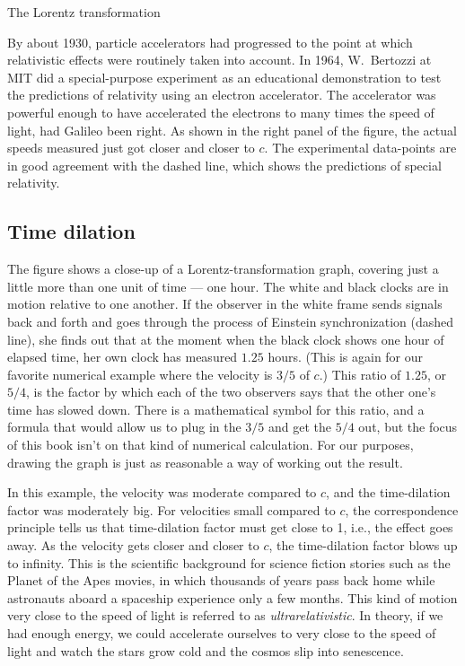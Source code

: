 \begin{section}{The Lorentz transformation}

By about 1930, particle accelerators had progressed to the point
at which relativistic effects were routinely taken into account. In
1964, W.~Bertozzi at MIT did a special-purpose experiment as an educational demonstration
to test the predictions of relativity using an electron accelerator.
The accelerator was powerful enough to have accelerated the electrons to many times
the speed of light, had Galileo been right. As shown in the right panel of the figure,
the actual speeds measured just got closer
and closer to $c$. The experimental data-points are in good agreement with the dashed line, which
shows the predictions of special relativity.

\section{Time dilation}

The figure shows a close-up of a Lorentz-transformation graph, covering just a little more
than one unit of time --- one hour. The white and black clocks are in motion relative to one
another. If the observer in the white frame sends signals back and forth and goes through the
process of Einstein synchronization (dashed line), she finds out that at the moment when the black clock shows
one hour of elapsed time, her own clock has measured $1.25$ hours. (This is again for our favorite
numerical example where the velocity is $3/5$ of $c$.) This ratio of $1.25$, or $5/4$, is the factor
by which each of the two observers says that the other one's time has slowed down. There is a mathematical
symbol for this ratio, and a formula that would allow us to plug in the $3/5$ and get the $5/4$ out, but
the focus of this book isn't on that kind of numerical calculation. For our purposes, drawing the graph
is just as reasonable a way of working out the result.


In this example, the velocity was moderate compared to $c$, and the time-dilation factor was moderately big.
For velocities small compared to $c$, the correspondence principle tells us that time-dilation factor must get close to 1,
i.e., the effect goes away.
As the velocity gets closer and closer to $c$, the time-dilation factor blows up to infinity. This is the
scientific background for science fiction stories such as the Planet of the Apes movies, in which thousands of
years pass back home while astronauts aboard a spaceship experience only a few months.
This kind of motion very close to the speed of light is referred to as
\emph{ultrarelativistic}. In theory, if we had enough
energy, we could accelerate ourselves to very close to the speed of light and watch the stars grow cold and the
cosmos slip into senescence.


\end{section}
